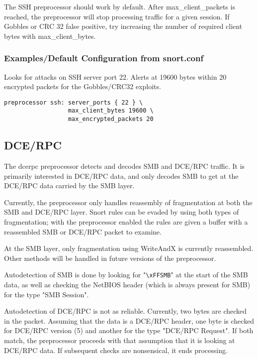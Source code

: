 \documentclass[english]{report}
\begin{document}
The SSH preprocessor should work by default.  After max\_client\_packets is
reached, the preprocessor will stop processing traffic for a given session.
If Gobbles or CRC 32 false positive, try increasing the number of required
client bytes with max\_client\_bytes.

\subsubsection{Examples/Default Configuration from snort.conf}

Looks for attacks on SSH server port 22.  Alerts at 19600 bytes
within 20 encrypted packets for the Gobbles/CRC32 exploits.

\begin{verbatim}
preprocessor ssh: server_ports { 22 } \
                  max_client_bytes 19600 \
                  max_encrypted_packets 20
\end{verbatim}

\subsection{DCE/RPC\label{sub:dcerpc}}

The dcerpc preprocessor detects and decodes SMB and DCE/RPC traffic.
It is primarily interested in DCE/RPC data, and only decodes SMB
to get at the DCE/RPC data carried by the SMB layer.

Currently, the preprocessor only handles reassembly of fragmentation
at both the SMB and DCE/RPC layer.  Snort rules can be evaded by
using both types of fragmentation; with the preprocessor enabled
the rules are given a buffer with a reassembled SMB or DCE/RPC
packet to examine.

At the SMB layer, only fragmentation using WriteAndX is currently
reassembled.  Other methods will be handled in future versions of
the preprocessor.

Autodetection of SMB is done by looking for "\verb!\xFFSMB!" at the
start of the SMB data, as well as checking the NetBIOS header (which
is always present for SMB) for the type "SMB Session".

Autodetection of DCE/RPC is not as reliable.  Currently, two bytes are
checked in the packet.  Assuming that the data is a DCE/RPC header,
one byte is checked for DCE/RPC version (5) and another for the type
"DCE/RPC Request".  If both match, the preprocessor proceeds with that
assumption that it is looking at DCE/RPC data.  If subsequent checks
are nonsensical, it ends processing.
\end{document}
